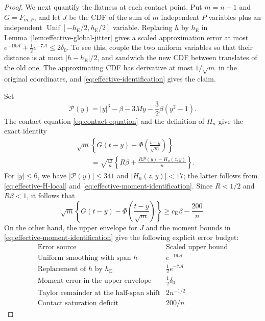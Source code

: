 \documentclass[aop]{imsart}
\theoremstyle{plain}
\theoremstyle{definition}
\theoremstyle{definition}
\newcommand{\ce}{c_{\mathrm E}}
\begin{document}
\begin{proof}
We next quantify the flatness at each contact point.  Put $m=n-1$
and $G=F_{m,P}$, and let $J$ be the CDF of the sum of $m$
independent $P$ variables plus an independent
$\operatorname{Unif}[-h_{\mathrm E}/2,h_{\mathrm E}/2]$ variable.
Replacing $h$ by $h_{\mathrm E}$ in Lemma~\ref{lem:effective-global-jitter}
gives a scaled approximation error at most
$e^{-19\mathcal A}+\tfrac12e^{-7\mathcal A}\le2\delta_0$.
To see this, couple the two uniform variables so that their
distance is at most $|h-h_{\mathrm E}|/2$, and sandwich the new CDF
between translates of the old one.  The approximating CDF has
derivative at most $1/\sqrt m$ in the original coordinates,
and \eqref{eq:effective-identification} gives the claim.

Set
\[
 \mathcal P(y)=|y|^3-\beta-3My-\frac32\beta(y^2-1).
\]
The contact equation \eqref{eq:contact-equation} and the
definition of $H_n$ give the exact identity
\begin{equation}\label{eq:effective-contact-exact}
 \begin{split}
 &\sqrt m\left\{G(t-y)-\Phi\left(\frac{t-y}{\sqrt m}\right)\right\}\\
 &\qquad=\sqrt{\frac mn}
       \left\{R\beta+\frac{R\mathcal P(y)-H_n(z,y)}n\right\}.
 \end{split}
\end{equation}
For $|y|\le6$, we have $|\mathcal P(y)|\le341$ and
$|H_n(z,y)|<17$; the latter follows from
\eqref{eq:effective-H-local} and
\eqref{eq:effective-moment-identification}.
Since $R<1/2$ and $R\beta<1$, it follows that
\begin{equation}\label{eq:effective-contact-saturation}
 \sqrt m\left\{G(t-y)-\Phi\left(\frac{t-y}{\sqrt m}\right)\right\}
 \ge\ce\beta-\frac{200}{n}.
\end{equation}
On the other hand, the upper envelope for $J$ and the moment
bounds in \eqref{eq:effective-moment-identification} give the
following explicit error budget:
\[
\begin{array}{ll}
\text{Error source}&\text{Scaled upper bound}\\[2pt]
\hline
\text{Uniform smoothing with span }h&e^{-19\mathcal A}\\
\text{Replacement of }h\text{ by }h_{\mathrm E}
 &\tfrac12e^{-7\mathcal A}\\
\text{Moment error in the upper envelope}&\tfrac12\delta_0\\
\text{Taylor remainder at the half-span shift}&2n^{-1/2}\\
\text{Contact saturation deficit}&200/n

\end{array}\]
\end{proof}
\end{document}
